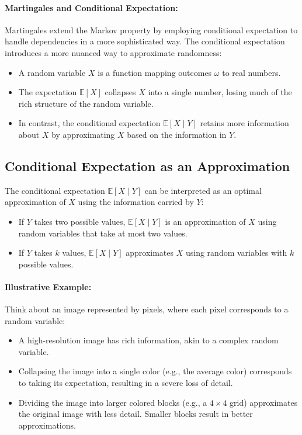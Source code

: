 \paragraph{Martingales and Conditional Expectation:}
Martingales extend the Markov property by employing conditional expectation to handle dependencies in a more sophisticated way. The conditional expectation introduces a more nuanced way to approximate randomness:
\begin{itemize}
    \item A random variable \( X \) is a function mapping outcomes \( \omega \) to real numbers.
    \item The expectation \( \mathbb{E}[X] \) collapses \( X \) into a single number, losing much of the rich structure of the random variable.
    \item In contrast, the conditional expectation \( \mathbb{E}[X \mid Y] \) retains more information about \( X \) by approximating \( X \) based on the information in \( Y \).
\end{itemize}

\subsection{Conditional Expectation as an Approximation}
The conditional expectation \( \mathbb{E}[X \mid Y] \) can be interpreted as an optimal approximation of \( X \) using the information carried by \( Y \):
\begin{itemize}
    \item If \( Y \) takes two possible values, \( \mathbb{E}[X \mid Y] \) is an approximation of \( X \) using random variables that take at most two values.
    \item If \( Y \) takes \( k \) values, \( \mathbb{E}[X \mid Y] \) approximates \( X \) using random variables with \( k \) possible values.
\end{itemize}

\paragraph{Illustrative Example:}
Think about an image represented by pixels, where each pixel corresponds to a random variable:
\begin{itemize}
    \item A high-resolution image has rich information, akin to a complex random variable.
    \item Collapsing the image into a single color (e.g., the average color) corresponds to taking its expectation, resulting in a severe loss of detail.
    \item Dividing the image into larger colored blocks (e.g., a \( 4 \times 4 \) grid) approximates the original image with less detail. Smaller blocks result in better approximations.
\end{itemize}

